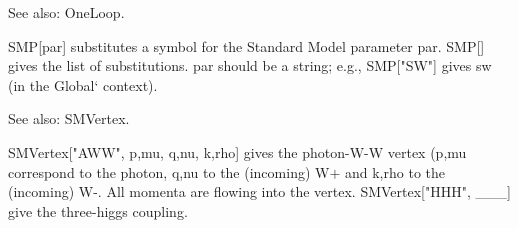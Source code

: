 See also:  OneLoop.



SMP[par] substitutes a symbol for the { }Standard Model parameter par. { }SMP[] gives the list of substitutions. par should be a string;
  e.g., SMP["SW"] gives { }sw (in the Global` context).



See also: SMVertex.






SMVertex["AWW", p,mu, q,nu, k,rho] gives the photon-W-W vertex (p,mu correspond to the photon, q,nu to the (incoming) W\(+\) and k,rho to
  the (incoming) W-. All momenta are flowing into the vertex. { }SMVertex["HHH", \_{}\_{}\_{}] give the three-higgs coupling. 



